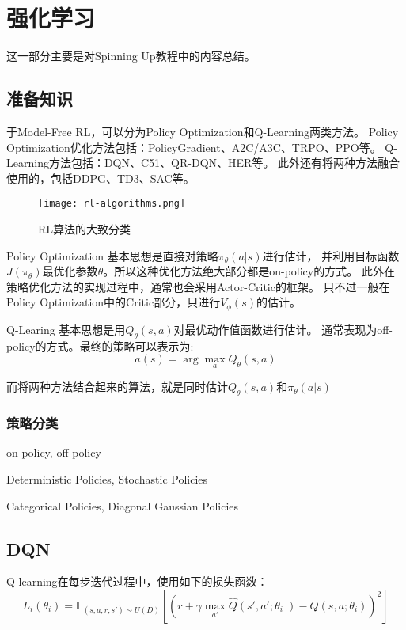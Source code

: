 \chapter{强化学习}
这一部分主要是对Spinning Up教程中的内容总结。

\section{准备知识}
于Model-Free RL，可以分为Policy Optimization和Q-Learning两类方法。
Policy Optimization优化方法包括：PolicyGradient、A2C/A3C、TRPO、PPO等。
Q-Learning方法包括：DQN、C51、QR-DQN、HER等。
此外还有将两种方法融合使用的，包括DDPG、TD3、SAC等。

\begin{figure}[htbp]
	\figskip 
	\centering
	\texttt{[image: rl-algorithms.png]}	  
	\caption{\label{fig: rl} RL算法的大致分类}
\end{figure}

Policy Optimization 基本思想是直接对策略$\pi_\theta(a|s)$进行估计，
并利用目标函数$J(\pi_\theta)$最优化参数$\theta$。所以这种优化方法绝大部分都是on-policy的方式。
此外在策略优化方法的实现过程中，通常也会采用Actor-Critic的框架。
只不过一般在Policy Optimization中的Critic部分，只进行$V_\phi(s)$的估计。

Q-Learing 基本思想是用$Q_\theta(s,a)$对最优动作值函数进行估计。
通常表现为off-policy的方式。最终的策略可以表示为:
\begin{equation*}
a(s) = \arg \max_a Q_\theta(s,a)
\end{equation*}

而将两种方法结合起来的算法，就是同时估计$Q_\theta(s,a)$和$\pi_\theta(a|s)$

\subsection{策略分类}
on-policy, off-policy

Deterministic Policies, Stochastic Policies

Categorical Policies, Diagonal Gaussian Policies


\section{DQN}
Q-learning在每步迭代过程中，使用如下的损失函数：
\begin{equation*}
    L_i(\theta_i) = \mathbb{E}_{(s,a,r,s')\sim U(D)} \left[ \left( r+\gamma \max_{a'} \hat{Q}(s',a';\theta_i^-) - Q(s,a;\theta_i) \right)^2 \right]
\end{equation*}

